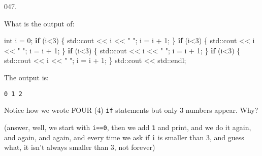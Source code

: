 \documentclass[]{book}
\newenvironment{Shaded}{}{}
\newcommand{\BuiltInTok}[1]{#1}
\newcommand{\ControlFlowTok}[1]{\textcolor[rgb]{0.00,0.44,0.13}{\textbf{#1}}}
\newcommand{\DataTypeTok}[1]{\textcolor[rgb]{0.56,0.13,0.00}{#1}}
\newcommand{\DecValTok}[1]{\textcolor[rgb]{0.25,0.63,0.44}{#1}}
\newcommand{\NormalTok}[1]{#1}
\newcommand{\StringTok}[1]{\textcolor[rgb]{0.25,0.44,0.63}{#1}}
\begin{document}
\begin{minipage}{\linewidth}\noindent
{\tiny 047.}\\
\begin{minipage}[t]{.485\linewidth}

What is the output of:

\begin{framed}

\begin{Shaded}
\begin{Highlighting}[]
\DataTypeTok{int}\NormalTok{ i = }\DecValTok{0}\NormalTok{;}
\ControlFlowTok{if}\NormalTok{ (i<}\DecValTok{3}\NormalTok{) \{}
  \BuiltInTok{std::}\NormalTok{cout << i << }\StringTok{" "}\NormalTok{;}
\NormalTok{  i = i + }\DecValTok{1}\NormalTok{;}
\NormalTok{\}}
\ControlFlowTok{if}\NormalTok{ (i<}\DecValTok{3}\NormalTok{) \{}
  \BuiltInTok{std::}\NormalTok{cout << i << }\StringTok{" "}\NormalTok{;}
\NormalTok{  i = i + }\DecValTok{1}\NormalTok{;}
\NormalTok{\}}
\ControlFlowTok{if}\NormalTok{ (i<}\DecValTok{3}\NormalTok{) \{}
  \BuiltInTok{std::}\NormalTok{cout << i << }\StringTok{" "}\NormalTok{;}
\NormalTok{  i = i + }\DecValTok{1}\NormalTok{;}
\NormalTok{\}}
\ControlFlowTok{if}\NormalTok{ (i<}\DecValTok{3}\NormalTok{) \{}
  \BuiltInTok{std::}\NormalTok{cout << i << }\StringTok{" "}\NormalTok{;}
\NormalTok{  i = i + }\DecValTok{1}\NormalTok{;}
\NormalTok{\}}
\BuiltInTok{std::}\NormalTok{cout << }\BuiltInTok{std::}\NormalTok{endl;}
\end{Highlighting}
\end{Shaded}

\end{framed}

\end{minipage}
\hfill
\begin{minipage}[t]{.485\linewidth}

The output is:

\begin{framed}

\begin{verbatim}
0 1 2 
\end{verbatim}

\end{framed}

Notice how we wrote FOUR (4) \texttt{if} statements but only 3 numbers
appear. Why?

(answer, well, we start with \texttt{i==0}, then we add \texttt{1} and
print, and we do it again, and again, and again, and every time we ask
if \texttt{i} is smaller than 3, and guess what, it isn't always smaller
than 3, not forever)

\end{minipage}
\end{minipage}
\end{document}
